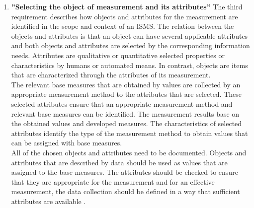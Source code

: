 \begin{enumerate}[label=(\alph*)]
  \item \label{itm:c} \textbf{''Selecting the object of measurement and its attributes''}
  The third requirement describes how objects and attributes for the measurement are identified in the scope and context of an ISMS. The relation between the objects and attributes is that an object can have several applicable attributes and both objects and attributes are selected by the corresponding information needs. Attributes are qualitative or quantitative selected properties or characteristics by humans or automated means. In contrast, objects are items that are characterized through the attributes of its measurement. \\
  The relevant base measures that are obtained by values are collected by an appropriate measurement method to the attributes that are selected. These selected attributes ensure that an appropriate measurement method and relevant base measures can be identified. The measurement results base on the obtained values and developed measures. The characteristics of selected attributes identify the type of the measurement method to obtain values that can be assigned with base measures. \\
  All of the chosen objects and attributes need to be documented. Objects and attributes that are described by data should be used as values that are assigned to the base measures. The attributes should be checked to ensure that they are appropriate for the measurement and for an effective measurement, the data collection should be defined in a way that sufficient attributes are available \cite{ISO_27004_2009}. \\


\end{enumerate}
